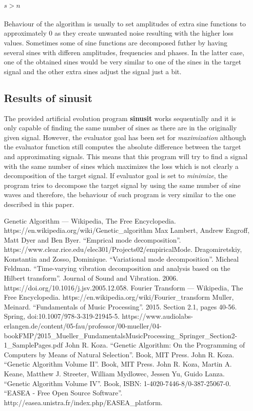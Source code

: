 \documentclass[conference]{IEEEtran}
\begin{document}
\paragraph{$s>n$}
Behaviour of the algorithm is usually to set amplitudes of extra sine functions to approximately 0 as they create unwanted noise resulting with the higher loss values. Sometimes some of sine functions are 
decomposed futher by having several sines with differen amplitudes, frequencies and phases. In the latter case, one of the obtained sines would be very similar to one of the sines in the target signal and 
the other extra sines adjust the signal just a bit.

\subsection{Results of \textbf{sinusit}}
The provided artificial evolution program \textbf{sinusit} works sequentially and it is only capable of finding the same number of sines as there are in the originally given signal. However, the evaluator 
goal has been set for \textit{maximization} although the evaluator function still computes the absolute difference between the target and approximating signals. This means that this program will try to find 
a signal with the same number of sines which maximizes the loss which is not clearly a decomposition of the target signal. If evaluator goal is set to \textit{minimize}, the program tries to decompose the 
target signal by using the same number of sine waves and therefore, the behaviour of such program is very similar to the one described in this paper.

\newpage
\begin{thebibliography}{00}
 Genetic Algorithm --- {W}ikipedia{,} The Free Encyclopedia. https://en.wikipedia.org/wiki/Genetic\_algorithm
 Max Lambert, Andrew Engroff, Matt Dyer and Ben Byer. ``Emprical mode decomposition''. https://www.clear.rice.edu/elec301/Projects02/empiricalMode.
 Dragomiretskiy, Konstantin and Zosso, Dominique. ``Variational mode decomposition''.
 Micheal Feldman. ``Time-varying vibration decomposition and analysis based on the Hilbert transform''. Journal of Sound and Vibration. 2006. https://doi.org/10.1016/j.jsv.2005.12.058.
 Fourier Transform --- {W}ikipedia{,} The Free Encyclopedia. https://en.wikipedia.org/wiki/Fourier\_transform
 Muller, Meinard. ``Fundamentals of Music Processing''. 2015. Section 2.1, pages 40-56. Spring, doi:10.1007/978-3-319-21945-5. https://www.audiolabs-erlangen.de/content/05-fau/professor/00-mueller/04-bookFMP/2015\_Mueller\_FundamentalsMusicProcessing\_Springer\_Section2-1\_SamplePages.pdf
 John R. Koza. ``Genetic Algorithm: On the Programming of Computers by Means of Natural Selection''. Book, MIT Press.
 John R. Koza. ``Genetic Algorithm Volume II''. Book, MIT Press.
 John R. Koza, Martin A. Keane, Matthew J. Streeter, William Mydlowec, Jessen Yu, Guido Lanza. ``Genetic Algorithm Volume IV''. Book, ISBN: 1-4020-7446-8/0-387-25067-0.
 ``EASEA - Free Open Source Software''. http://easea.unistra.fr/index.php/EASEA\_platform.
\end{thebibliography}
\end{document}
